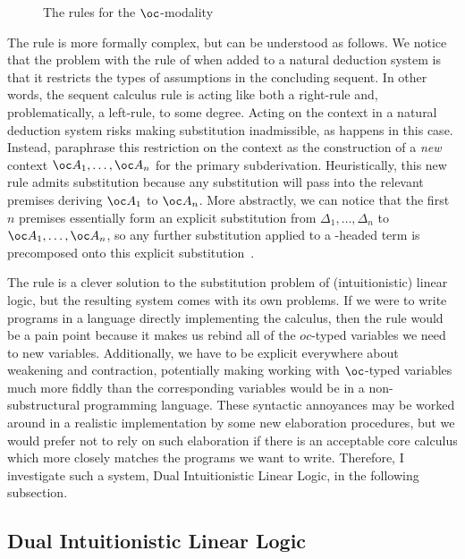 \begin{figure}
  \caption{The \citet{BBdePH93} rules for the $\oc$-modality}
  \label{fig:BBdePH}
\end{figure}

The \citeauthor{BBdePH93}  rule is more formally complex, but
can be understood as follows.
We notice that the problem with the  rule of
 when added to a natural deduction system is that it
restricts the types of assumptions in the concluding sequent.
In other words, the sequent calculus  rule is acting like
both a right-rule and, problematically, a left-rule, to some degree.
Acting on the context in a natural deduction system risks making substitution
inadmissible, as happens in this case.
Instead, \citeauthor{BBdePH93} paraphrase this restriction on the context as the
construction of a \emph{new} context $\oc A_1, \ldots, \oc A_n$ for the primary
subderivation.
Heuristically, this new  rule admits substitution because any
substitution will pass into the relevant premises deriving $\oc A_1$ to
$\oc A_n$.
More abstractly, we can notice that the first $n$ premises essentially form an
explicit substitution from $\Delta_1, \ldots, \Delta_n$ to
$\oc A_1, \ldots, \oc A_n$, so any further substitution applied
to a -headed term is precomposed onto this explicit
substitution~\citep{ACCL91}.

The \citeauthor{BBdePH93}  rule is a clever solution to the
substitution problem of (intuitionistic) linear logic, but the resulting system
comes with its own problems.
If we were to write programs in a language directly implementing the
\citeauthor{BBdePH93} calculus, then the  rule would be a
pain point because it makes us rebind all of the $oc$-typed variables we need to
new variables.
Additionally, we have to be explicit everywhere about weakening and contraction,
potentially making working with $\oc$-typed variables much more fiddly than the
corresponding variables would be in a non-substructural programming language.
These syntactic annoyances may be worked around in a realistic implementation by
some new elaboration procedures, but we would prefer not to rely on such
elaboration if there is an acceptable core calculus which more closely matches
the programs we want to write.
Therefore, I investigate such a system, Dual Intuitionistic Linear Logic, in the
following subsection.

\subsection{Dual Intuitionistic Linear Logic}\label{sec:dill}

